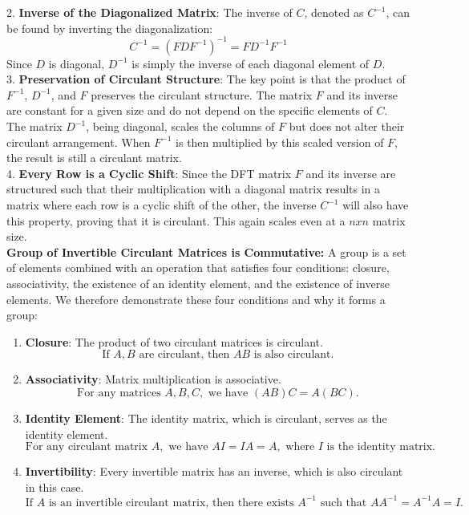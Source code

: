 \documentclass[8pt]{article}
\begin{document}
2. \textbf{Inverse of the Diagonalized Matrix}: The inverse of \( C \), denoted as \( C^{-1} \), can be found by inverting the diagonalization:
\[ C^{-1} = (FDF^{-1})^{-1} = FD^{-1}F^{-1}\]
Since \( D \) is diagonal, \( D^{-1} \) is simply the inverse of each diagonal element of \( D \). \\

3. \textbf{Preservation of Circulant Structure}: The key point is that the product of \( F^{-1} \), \( D^{-1} \), and \( F \) preserves the circulant structure. The matrix \( F \) and its inverse are constant for a given size and do not depend on the specific elements of \( C \). The matrix \( D^{-1} \), being diagonal, scales the columns of \( F \) but does not alter their circulant arrangement. When \( F^{-1} \) is then multiplied by this scaled version of \( F \), the result is still a circulant matrix. \\ 

4. \textbf{Every Row is a Cyclic Shift}: Since the DFT matrix \( F \) and its inverse are structured such that their multiplication with a diagonal matrix results in a matrix where each row is a cyclic shift of the other, the inverse \( C^{-1} \) will also have this property, proving that it is circulant. This again scales even at a $nxn$ matrix size.\\

\textbf{Group of Invertible Circulant Matrices is Commutative:} A group is a set of elements combined with an operation that satisfies four conditions: closure, associativity, the existence of an identity element, and the existence of inverse elements. We therefore demonstrate these four conditions and why it forms a group: 

\begin{enumerate}
    \item \textbf{Closure}: The product of two circulant matrices is circulant.
    \[ \text{If } A, B \text{ are circulant, then } AB \text{ is also circulant.} \]

    \item \textbf{Associativity}: Matrix multiplication is associative.
    \[ \text{For any matrices } A, B, C, \text{ we have } (AB)C = A(BC). \]

    \item \textbf{Identity Element}: The identity matrix, which is circulant, serves as the identity element.
    \[ \text{For any circulant matrix } A, \text{ we have } AI = IA = A, \text{ where } I \text{ is the identity matrix.} \]

    \item \textbf{Invertibility}: Every invertible matrix has an inverse, which is also circulant in this case.
    \[ \text{If } A \text{ is an invertible circulant matrix, then there exists } A^{-1} \text{ such that } AA^{-1} = A^{-1}A = I. \]
\end{enumerate}
\end{document}
